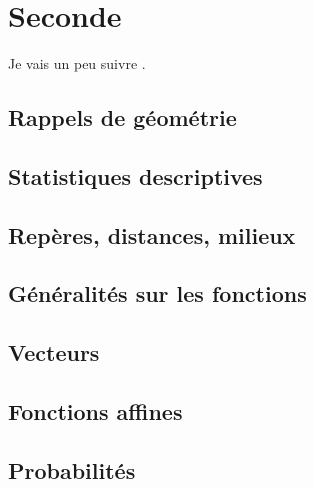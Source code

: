 \documentclass[a4paper,12pt]{book}
\begin{document}



\newpage



\tableofcontents

\newpage

\part{Seconde}

Je vais un peu suivre \cite{oklaEg}.
\setcounter{chapter}{-1}

\chapter{Rappels de géométrie}


\chapter{Statistiques descriptives}




\chapter{Repères, distances, milieux}


\chapter{Généralités sur les fonctions}


\chapter{Vecteurs}


\chapter{Fonctions affines}


\chapter{Probabilités}

\end{document}
